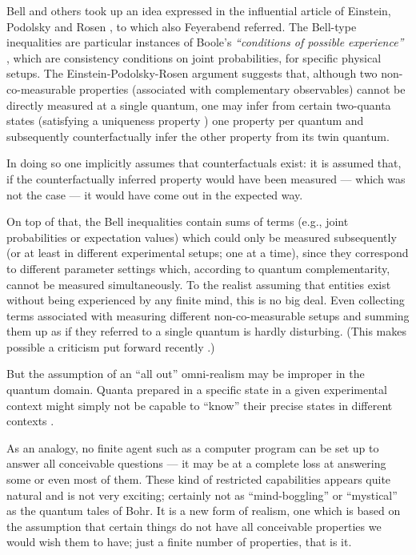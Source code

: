 \documentclass{article}
\begin{document}
Bell \cite{bell-87} and others took up an idea expressed
in the influential article of Einstein, Podolsky and Rosen \cite{epr}, to which also Feyerabend referred.
The Bell-type inequalities are particular instances of Boole's
{\em ``conditions of possible experience''} \cite{Boole,Boole-62},
which are consistency conditions on joint probabilities,
for specific physical setups.
The   Einstein-Podolsky-Rosen argument
suggests that, although two non-co-measurable properties
(associated with complementary observables)
cannot be directly measured at a single quantum,
one may infer from certain two-quanta states
(satisfying a uniqueness property \cite{svozil-2004-vax})
one property per quantum and subsequently counterfactually
infer the other property from its twin quantum.

In doing so one implicitly assumes that counterfactuals exist:
it is assumed that, if the counterfactually inferred property would have been measured
---
which was not the case
---
it would have come out in the expected way.

On top of that,
the Bell inequalities contain sums of terms (e.g., joint probabilities or expectation values)
which
could only be measured subsequently (or at least in different experimental setups; one at a time),
since they correspond to different parameter settings which, according
to quantum complementarity,
cannot be measured simultaneously.
To the realist assuming that
entities exist without being experienced by any finite mind,
this is no big deal.
Even collecting terms associated with measuring different non-co-measurable setups
and summing them up as if they referred to a single quantum is hardly disturbing.
(This makes possible a criticism put forward recently \cite{Hess&Philipp2002}.)

But the assumption of an ``all out'' omni-realism may be improper in the quantum domain.
Quanta prepared in a specific state in a given experimental context
might simply not be capable to ``know''
their precise states in different contexts \cite{svozil-2003-garda}.

As an analogy, no finite agent such as a computer program can be set up to answer
all conceivable questions  --- it may be at a complete loss at answering some or even most of them.
These kind of restricted capabilities appears quite natural and is not very exciting; certainly not
as ``mind-boggling'' or ``mystical'' as the quantum tales of Bohr.
It is a new form of realism,
one which is based on the assumption that certain things do not have all conceivable properties
we would wish them to have; just a finite number of properties, that is it.
\end{document}
